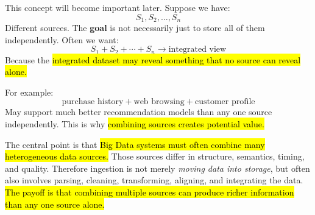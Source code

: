 \highspace
\begin{deepeningbox}
    This concept will become important later. Suppose we have:
    \begin{equation*}
        S_1,S_2,\ldots,S_n
    \end{equation*}
    Different sources. The \textbf{goal} is not necessarily just to store all of them independently. Often we want:
    \begin{equation*}
        S_1 + S_2 + \cdots + S_n
        \rightarrow
        \text{integrated view}
    \end{equation*}
    Because the \hl{integrated dataset may reveal something that no source can reveal alone.}

    \highspace
    For example:
    \begin{equation*}
        \text{purchase history}
        +
        \text{web browsing}
        +
        \text{customer profile}
    \end{equation*}
    May support much better recommendation models than any one source independently. This is why \hl{combining sources creates potential value.}
\end{deepeningbox}

\highspace
\begin{takeawaysbox}
    The central point is that \hl{Big Data systems must often combine many heterogeneous data sources.} Those sources differ in structure, semantics, timing, and quality. Therefore ingestion is not merely \emph{moving data into storage}, but often also involves parsing, cleaning, transforming, aligning, and integrating the data. \hl{The payoff is that combining multiple sources can produce richer information than any one source alone.}
\end{takeawaysbox}